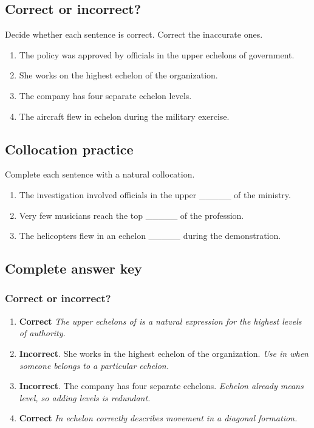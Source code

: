 \documentclass[11pt]{article}
\begin{document}
\subsection{Correct or incorrect?}
Decide whether each sentence is correct. Correct the inaccurate ones.

\begin{enumerate}
  \item The policy was approved by officials in the upper echelons of government.
  \item She works on the highest echelon of the organization.
  \item The company has four separate echelon levels.
  \item The aircraft flew in echelon during the military exercise.
\end{enumerate}

\subsection{Collocation practice}
Complete each sentence with a natural collocation.

\begin{enumerate}
  \item The investigation involved officials in the upper \_\_\_\_\_ of the ministry.
  \item Very few musicians reach the top \_\_\_\_\_ of the profession.
  \item The helicopters flew in an echelon \_\_\_\_\_ during the demonstration.
\end{enumerate}

\subsection{Complete answer key}
\subsubsection{Correct or incorrect?}
\begin{enumerate}
  \item \textbf{Correct} \emph{The upper echelons of is a natural expression for the highest levels of authority.}
  \item \textbf{Incorrect}. She works in the highest echelon of the organization. \emph{Use in when someone belongs to a particular echelon.}
  \item \textbf{Incorrect}. The company has four separate echelons. \emph{Echelon already means level, so adding levels is redundant.}
  \item \textbf{Correct} \emph{In echelon correctly describes movement in a diagonal formation.}
\end{enumerate}
\end{document}
